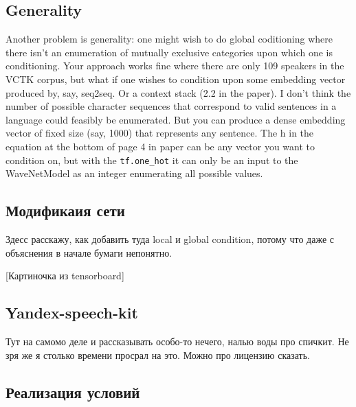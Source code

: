 \documentclass[../diploma.tex]{subfiles}
\begin{document}
    
    
    \subsection{Generality}
    Another problem is generality: one might wish to do global coditioning where there isn't an 
    enumeration of mutually exclusive categories upon which one is conditioning. Your approach works fine
    where there are only 109 speakers in the VCTK corpus, but what if one wishes to condition upon some
    embedding vector produced by, say, seq2seq. Or a context stack (2.2 in the paper). I don't think the
    number of possible character sequences that correspond to valid sentences in a language could
    feasibly be enumerated. But you can produce a dense embedding vector of fixed size (say, 1000) that
    represents any sentence. The h in the equation at the bottom of page 4 in paper can be any vector you
    want to condition on, but with the \verb|tf.one_hot| it can only be an input to the WaveNetModel as an
    integer enumerating all possible values.
    
    \subsection{Модификаия сети}
    Здесс расскажу, как добавить туда local и global condition, потому что даже с объяснения в начале бумаги непонятно.
    
    [Картиночка из tensorboard]
    
    \subsection{Yandex-speech-kit}
    Тут на самомо деле и рассказывать особо-то нечего, налью воды про спичкит. Не зря же я столько времени просрал на это. Можно про лицензию сказать.


    \subsection{Реализация условий}
    
\end{document}
